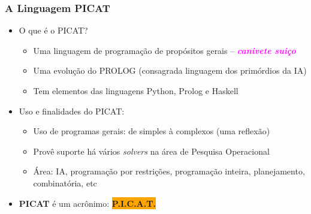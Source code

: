 \begin{frame}[fragile]

  \frametitle{A Linguagem PICAT}
  \begin{itemize}
    \item O que é o PICAT?
    
    \pause
       \begin{itemize}
			\item Uma linguagem de programação de propósitos gerais -- \textcolor{magenta}{\textbf{\textit{canivete suiço}}}
			\item Uma evolução do PROLOG (consagrada linguagem dos primórdios da IA)
			\item Tem elementos das linguagens Python, Prolog e Haskell
		\end{itemize}

    \item Uso e finalidades do PICAT:
    
    \pause
       \begin{itemize}
			\item Uso de programas gerais: de simples à complexos (uma reflexão)
			\item Provê suporte há vários \textit{solvers} na área de Pesquisa Operacional
			\item Área: IA, programação por restrições, programação inteira, planejamento,
			combinatória, etc
		\end{itemize}

   \pause
   \item \textsc{\textbf{PICAT}} é um acrônimo: \pause \colorbox{orange}{{\Large \textbf{P.I.C.A.T.}}}

   \end{itemize}

  \end{frame}
    
